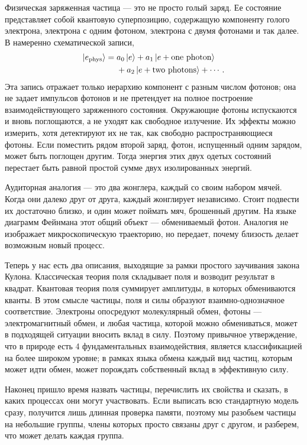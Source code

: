 Физическая заряженная частица — это не просто голый заряд. Ее состояние представляет собой квантовую суперпозицию, содержащую компоненту голого электрона, электрона с одним фотоном, электрона с двумя фотонами и так далее. В намеренно схематической записи,
\begin{equation}
\begin{aligned}
\left\lvert e_{\mathrm{phys}}\right\rangle
={}&a_0\left\lvert e\right\rangle
+a_1\left\lvert e+\text{one photon}\right\rangle
\\
&+a_2\left\lvert e+\text{two photons}\right\rangle+\cdots .
\end{aligned}
\end{equation}
Эта запись отражает только иерархию компонент с разным числом фотонов; она не задает импульсов фотонов и не претендует на полное построение взаимодействующего заряженного состояния.
Окружающие фотоны испускаются и вновь поглощаются, а не уходят как свободное излучение. Их эффекты можно измерить, хотя детектируют их не так, как свободно распространяющиеся фотоны. Если поместить рядом второй заряд, фотон, испущенный одним зарядом, может быть поглощен другим. Тогда энергия этих двух одетых состояний перестает быть равной простой сумме двух изолированных энергий.

Аудиторная аналогия — это два жонглера, каждый со своим набором мячей. Когда они далеко друг от друга, каждый жонглирует независимо. Стоит подвести их достаточно близко, и один может поймать мяч, брошенный другим. На языке диаграмм Фейнмана этот общий объект — обмениваемый фотон. Аналогия не изображает микроскопическую траекторию, но передает, почему близость делает возможным новый процесс.

Теперь у нас есть два описания, выходящие за рамки простого заучивания закона Кулона. Классическая теория поля складывает поля и возводит результат в квадрат. Квантовая теория поля суммирует амплитуды, в которых обмениваются кванты. В этом смысле частицы, поля и силы образуют взаимно-однозначное соответствие. Электроны опосредуют молекулярный обмен, фотоны — электромагнитный обмен, и любая частица, которой можно обмениваться, может в подходящей ситуации вносить вклад в силу. Поэтому привычное утверждение, что в природе есть 4 фундаментальных взаимодействия, является классификацией на более широком уровне; в рамках языка обмена каждый вид частиц, которым может идти обмен, может порождать собственный вклад в эффективную силу.

Наконец пришло время назвать частицы, перечислить их свойства и сказать, в каких процессах они могут участвовать. Если выписать всю стандартную модель сразу, получится лишь длинная проверка памяти, поэтому мы разобьем частицы на небольшие группы, члены которых просто связаны друг с другом, и разберем, что может делать каждая группа.

